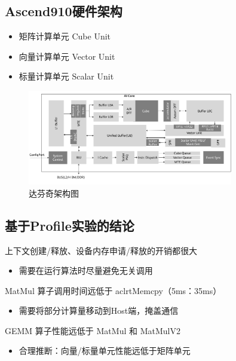 \documentclass[
    fontset=fandol,
    xcolor=svgnames %
]{ctexbeamer}
\begin{document}
\subsection{Ascend910硬件架构}
\begin{frame}
    \begin{itemize}
        \item 矩阵计算单元 Cube Unit
        \item 向量计算单元 Vector Unit
        \item 标量计算单元 Scalar Unit
    \end{itemize}
    \begin{figure}[h]
        \centering
        \includegraphics[width=0.8\textwidth]{../image/chap03/davinci.png}
        \caption{达芬奇架构图}
        \label{达芬奇架构图}
    \end{figure}
\end{frame}

\subsection{基于Profile实验的结论}
\begin{frame}
    \begin{block}{上下文创建/释放、设备内存申请/释放的开销都很大}
        \begin{itemize}
            \item 需要在运行算法时尽量避免无关调用
        \end{itemize}
    \end{block}
    \begin{block}{MatMul 算子调用时间远低于 aclrtMemcpy（5ms：35ms）}
        \begin{itemize}
            \item 需要将部分计算量移动到Host端，掩盖通信
        \end{itemize}
    \end{block}
    \begin{block}{GEMM 算子性能远低于 MatMul 和 MatMulV2}
        \begin{itemize}
            \item 合理推断：向量/标量单元性能远低于矩阵单元
        \end{itemize}
    \end{block}
\end{frame}
\end{document}
